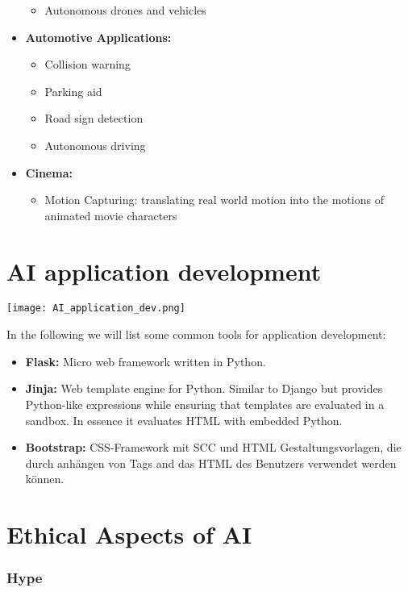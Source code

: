 \begin{itemize}
\begin{itemize}
              \item Autonomous drones and vehicles
          \end{itemize}
    \item \textbf{Automotive Applications:}
          \begin{itemize}
              \item Collision warning
              \item Parking aid
              \item Road sign detection
              \item Autonomous driving
          \end{itemize}
    \item \textbf{Cinema:}
          \begin{itemize}
              \item Motion Capturing: translating real world motion into the motions of animated movie characters
          \end{itemize}
\end{itemize}

\section{AI application development}

\texttt{[image: AI\_application\_dev.png]}

In the following we will list some common tools for application development:

\begin{itemize}
    \item \textbf{Flask:} Micro web framework written in Python.
    \item \textbf{Jinja:} Web template engine for Python. Similar to Django but provides Python-like expressions while ensuring that templates are evaluated in a sandbox. In essence it evaluates HTML with embedded Python.
    \item \textbf{Bootstrap:} CSS-Framework mit SCC und HTML Gestaltungsvorlagen, die durch anhängen von Tags and das HTML des Benutzers verwendet werden können.
\end{itemize}

\section{Ethical Aspects of AI}

\subsubsection*{Hype}

